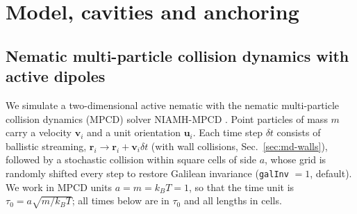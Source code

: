 
\section{Model, cavities and anchoring}
\label{sec:md-model}

\subsection{Nematic multi-particle collision dynamics with active dipoles}
\label{sec:md-mpcd}

We simulate a two-dimensional active nematic with the nematic multi-particle collision
dynamics (MPCD) solver NIAMH-MPCD
\cite{TODO_nematicMPCD,TODO_activeMPCD,TODO_Kozhukhov2024}.
Point particles of mass $m$ carry a velocity $\mathbf v_i$ and a unit orientation $\mathbf u_i$.
Each time step $\delta t$ consists of ballistic streaming, $\mathbf r_i\to\mathbf r_i+\mathbf v_i\delta t$
(with wall collisions, Sec.~\ref{sec:md-walls}), followed by a stochastic collision within
square cells of side $a$, whose grid is randomly shifted every step to restore Galilean
invariance (\texttt{galInv} $=1$, default). We work in MPCD units $a=m=k_BT=1$, so that the time unit is
$\tau_0=a\sqrt{m/k_BT}$; all times below are in $\tau_0$ and all lengths in cells.

